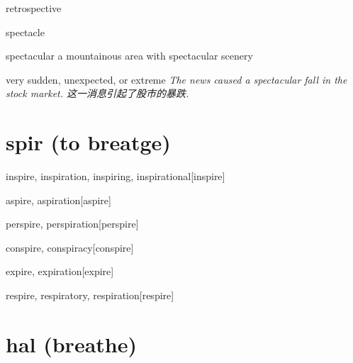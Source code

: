 \begin{RefWord}{retrospective}
\end{RefWord}

\begin{RefWord}{spectacle}
\end{RefWord}

\begin{RefWord}{spectacular}
    a mountainous area with spectacular scenery

    very sudden, unexpected, or extreme
    \textit{The news caused a spectacular fall in the stock market. 这一消息引起了股市的暴跌. }
\end{RefWord}


















\section{spir (to breatge)}





\begin{RefWord}{inspire, inspiration, inspiring, inspirational}[inspire]
\end{RefWord}

\begin{RefWord}{aspire, aspiration}[aspire]
\end{RefWord}

\begin{RefWord}{perspire, perspiration}[perspire]
\end{RefWord}

\begin{RefWord}{conspire, conspiracy}[conspire]
\end{RefWord}

\begin{RefWord}{expire, expiration}[expire]
\end{RefWord}

\begin{RefWord}{respire, respiratory, respiration}[respire]
\end{RefWord}


\section{hal (breathe)}

